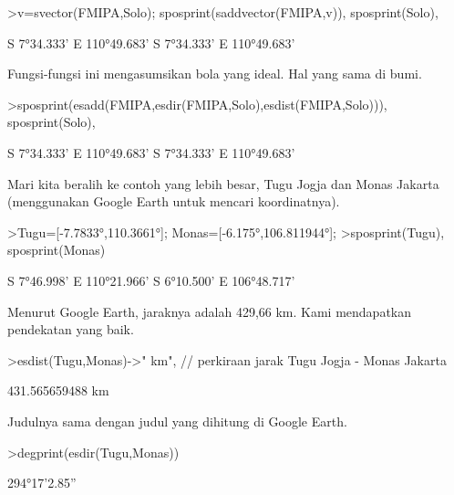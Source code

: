 \documentclass[a4paper,10pt]{article}
\begin{document}
\begin{eulernotebook}
\begin{eulercomment}
\begin{eulercomment}
\begin{eulerprompt}
>v=svector(FMIPA,Solo); sposprint(saddvector(FMIPA,v)), sposprint(Solo),
\end{eulerprompt}
\begin{euleroutput}
  S 7°34.333' E 110°49.683'
  S 7°34.333' E 110°49.683'
\end{euleroutput}
\begin{eulercomment}
Fungsi-fungsi ini mengasumsikan bola yang ideal. Hal yang sama di
bumi.
\end{eulercomment}
\begin{eulerprompt}
>sposprint(esadd(FMIPA,esdir(FMIPA,Solo),esdist(FMIPA,Solo))), sposprint(Solo),
\end{eulerprompt}
\begin{euleroutput}
  S 7°34.333' E 110°49.683'
  S 7°34.333' E 110°49.683'
\end{euleroutput}
\begin{eulercomment}
Mari kita beralih ke contoh yang lebih besar, Tugu Jogja dan Monas
Jakarta (menggunakan Google Earth untuk mencari koordinatnya).
\end{eulercomment}
\begin{eulerprompt}
>Tugu=[-7.7833°,110.3661°]; Monas=[-6.175°,106.811944°];
>sposprint(Tugu), sposprint(Monas)
\end{eulerprompt}
\begin{euleroutput}
  S 7°46.998' E 110°21.966'
  S 6°10.500' E 106°48.717'
\end{euleroutput}
\begin{eulercomment}
Menurut Google Earth, jaraknya adalah 429,66 km. Kami mendapatkan
pendekatan yang baik.
\end{eulercomment}
\begin{eulerprompt}
>esdist(Tugu,Monas)->" km", // perkiraan jarak Tugu Jogja - Monas Jakarta
\end{eulerprompt}
\begin{euleroutput}
  431.565659488 km
\end{euleroutput}
\begin{eulercomment}
Judulnya sama dengan judul yang dihitung di Google Earth.
\end{eulercomment}
\begin{eulerprompt}
>degprint(esdir(Tugu,Monas))
\end{eulerprompt}
\begin{euleroutput}
  294°17'2.85''
\end{euleroutput}
\begin{eulercomment}

\end{eulercomment}
\end{eulercomment}
\end{eulercomment}
\end{eulernotebook}
\end{document}
